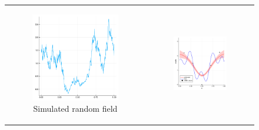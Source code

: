 \documentclass{article}
\numberwithin{equation}{section}
\begin{document}
\begin{figure}[t!]
  \centering
  \begin{tabular}{cc}
    \begin{subfigure}[t]{0.3\textwidth}
      \includegraphics[width=\textwidth]{figures/scale/dat-nss-p1000.pdf}
      \caption{Simulated random field}
    \end{subfigure} &
    \begin{subfigure}[t]{0.3\textwidth}
      \includegraphics[width=\textwidth]{figures/scale/est-p1000-a5-se1.pdf}

\end{subfigure}
\end{tabular}
\end{figure}
\end{document}
